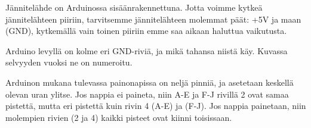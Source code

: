 \begin{tcolorbox}[title=Jännitelähteen kytkeminen]
Jännitelähde on Arduinossa sisäänrakennettuna. Jotta voimme kytkeä jännitelähteen piiriin, tarvitsemme jännitelähteen molemmat päät: +5V ja maan (GND), kytkemällä vain toinen piiriin emme saa aikaan haluttua vaikutusta.

Arduino levyllä on kolme eri GND-riviä, ja mikä tahansa niistä käy. Kuvassa selvyyden vuoksi ne on numeroitu.

\begin{minipage}{0.3\textwidth}
 \end{minipage}
\begin{minipage}{0.7\textwidth}
\end{minipage}
\end{tcolorbox}

\begin{tcolorbox}[title=Painonapin kytkeminen,colback=blue!10,colbacktitle=purple!90]
Arduinon mukana tulevassa painonapissa on neljä pinniä, ja asetetaan keskellä olevan uran ylitse. Jos nappia ei paineta, niin A-E ja F-J rivillä 2 ovat samaa pistettä, mutta eri pistettä kuin rivin 4 (A-E) ja (F-J). Jos nappia painetaan, niin molempien rivien (2 ja 4) kaikki pisteet ovat kiinni toisissaan.


\end{tcolorbox}

